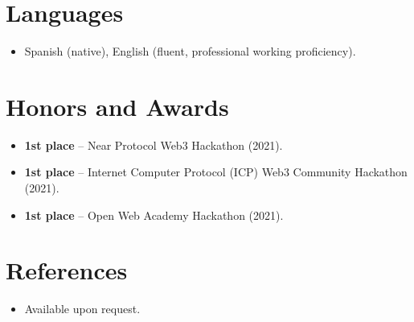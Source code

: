 \documentclass[11pt,a4paper,sans]{moderncv}
\begin{document}

\section{Languages}
\vspace{1pt}
\begin{itemize}
\item Spanish (native), English (fluent, professional working proficiency).
\end{itemize}


\section{Honors and Awards}
\vspace{1pt}
\begin{itemize}
\item{\textbf{1st place} -- Near Protocol Web3 Hackathon (2021).}
\item{\textbf{1st place} -- Internet Computer Protocol (ICP) Web3 Community Hackathon (2021).}
\item{\textbf{1st place} -- Open Web Academy Hackathon (2021).}
\end{itemize}


\section{References}
\vspace{1pt}
\begin{itemize}
\item{Available upon request.}
\end{itemize}
\end{document}
